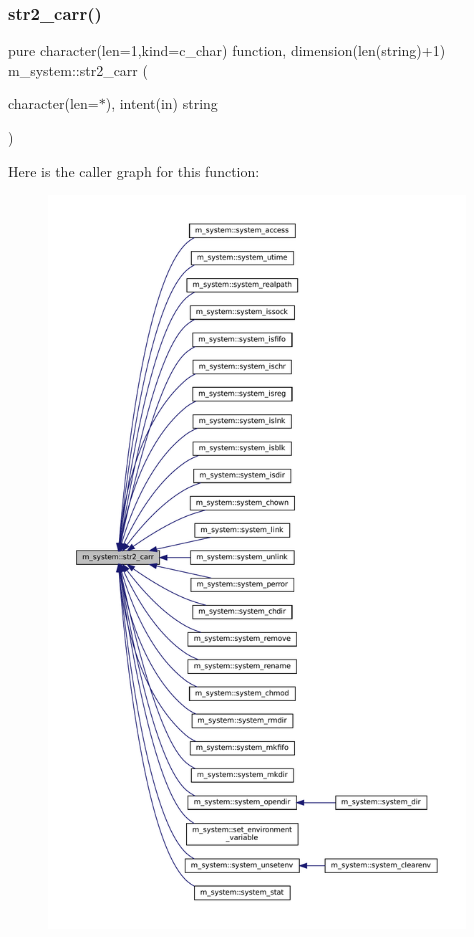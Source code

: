 \subsubsection{\texorpdfstring{str2\+\_\+carr()}{str2\_carr()}}
{\footnotesize\ttfamily pure character(len=1,kind=c\+\_\+char) function, dimension(len(string)+1) m\+\_\+system\+::str2\+\_\+carr (\begin{DoxyParamCaption}\item[{character(len=$\ast$), intent(in)}]{string }\end{DoxyParamCaption})\hspace{0.3cm}{\ttfamily [private]}}

Here is the caller graph for this function\+:
\nopagebreak
\begin{figure}[H]
\begin{center}
\leavevmode
\includegraphics[height=550pt]{namespacem__system_a58bb591b5b9fefec3960a28361aae07a_icgraph}
\end{center}
\end{figure}
\mbox{\label{namespacem__system_a4c1c906730e61629a8277e1daeda90f6}} 

